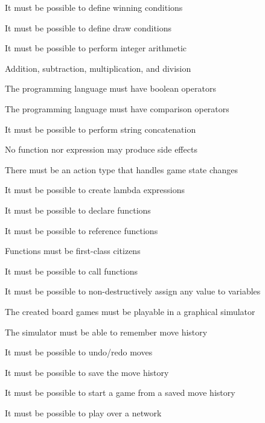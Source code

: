 \begin{dlist}
  \item It must be possible to define winning conditions
  \item It must be possible to define draw conditions
  \item It must be possible to perform integer arithmetic
  \begin{dlist}
    \item Addition, subtraction, multiplication, and division
    \item The programming language must have boolean operators
    \item The programming language must have comparison operators
  \end{dlist}
  \item It must be possible to perform string concatenation
  \item No function nor expression may produce side effects
  \item There must be an action type that handles game state changes
  \item It must be possible to create lambda expressions
  \item It must be possible to declare functions
  \item It must be possible to reference functions
  \begin{dlist}
    \item Functions must be first-class citizens
    \item It must be possible to call functions
  \end{dlist}
  \item It must be possible to non-destructively assign any value to variables
  \item The created board games must be playable in a graphical simulator
  \item The simulator must be able to remember move history
  \begin{dlist}
    \item It must be possible to undo/redo moves
    \item It must be possible to save the move history
    \begin{dlist}
      \item It must be possible to start a game from a saved move history
    \end{dlist}
  \item It must be possible to play over a network
  \end{dlist}
\end{dlist}

